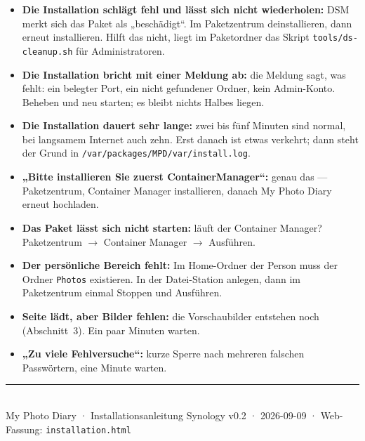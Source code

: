 \documentclass[11pt,a4paper]{article}
\let\mpdtt\texttt
\renewcommand{\texttt}[1]{\mpdtt{\textcolor{mpdred}{#1}}}
\begin{document}
\begin{itemize}
  \item \textbf{Die Installation schlägt fehl und lässt sich nicht wiederholen:}
    DSM merkt sich das Paket als „beschädigt“. Im Paketzentrum deinstallieren,
    dann erneut installieren. Hilft das nicht, liegt im Paketordner das Skript
    \texttt{tools/ds-cleanup.sh} für Administratoren.
  \item \textbf{Die Installation bricht mit einer Meldung ab:} die Meldung
    sagt, was fehlt: ein belegter Port, ein nicht gefundener Ordner, kein
    Admin-Konto. Beheben und neu starten; es bleibt nichts Halbes liegen.
  \item \textbf{Die Installation dauert sehr lange:} zwei bis fünf Minuten sind
    normal, bei langsamem Internet auch zehn. Erst danach ist etwas verkehrt;
    dann steht der Grund in \texttt{/var/packages/MPD/var/install.log}.
  \item \textbf{„Bitte installieren Sie zuerst ContainerManager“:} genau das
    --- Paketzentrum, Container Manager installieren, danach My Photo Diary
    erneut hochladen.
  \item \textbf{Das Paket lässt sich nicht starten:} läuft der Container
    Manager? Paketzentrum \(\rightarrow\) Container Manager \(\rightarrow\)
    Ausführen.
  \item \textbf{Der persönliche Bereich fehlt:} Im Home-Ordner der Person muss
    der Ordner \texttt{Photos} existieren. In der Datei-Station anlegen, dann
    im Paketzentrum einmal Stoppen und Ausführen.
  \item \textbf{Seite lädt, aber Bilder fehlen:} die Vorschaubilder entstehen
    noch (Abschnitt~3). Ein paar Minuten warten.
  \item \textbf{„Zu viele Fehlversuche“:} kurze Sperre nach mehreren falschen
    Passwörtern, eine Minute warten.
\end{itemize}

\vspace{2em}
\begin{center}
  {\color{mpdrule}\rule{0.5\linewidth}{0.8pt}}\\[6pt]
  {\color{mpdgrey}\small My Photo Diary · Installationsanleitung Synology v0.2 ·
   2026-09-09 · Web-Fassung: \texttt{installation.html}}
\end{center}
\end{document}
